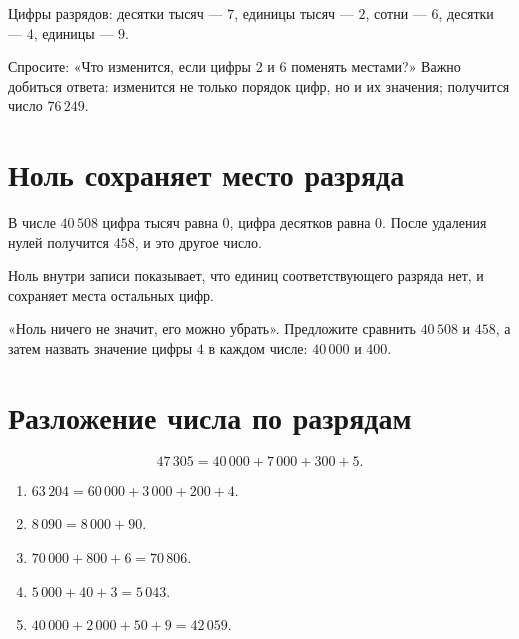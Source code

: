 Цифры разрядов: десятки тысяч --- \(7\), единицы тысяч --- \(2\),
сотни --- \(6\), десятки --- \(4\), единицы --- \(9\).

\begin{teacherbox}
  Спросите: «Что изменится, если цифры \(2\) и \(6\) поменять местами?»
  Важно добиться ответа: изменится не только порядок цифр, но и их значения;
  получится число \(76\,249\).
\end{teacherbox}

\section{Ноль сохраняет место разряда}

\zeroplacefigure

В числе \(40\,508\) цифра тысяч равна \(0\), цифра десятков равна \(0\).
После удаления нулей получится \(458\), и это другое число.

\begin{conclusionbox}
  Ноль внутри записи показывает, что единиц соответствующего разряда нет,
  и сохраняет места остальных цифр.
\end{conclusionbox}

\begin{teacherbox}
  «Ноль ничего не значит, его можно убрать». Предложите сравнить
  \(40\,508\) и \(458\), а затем назвать значение цифры \(4\) в каждом
  числе: \(40\,000\) и \(400\).
\end{teacherbox}

\section{Разложение числа по разрядам}

\expandedformfigure

\[
  47\,305=40\,000+7\,000+300+5.
\]

\begin{fillbox}[Ответы]
  \begin{enumerate}
    \item \(63\,204=60\,000+3\,000+200+4\).
    \item \(8\,090=8\,000+90\).
    \item \(70\,000+800+6=70\,806\).
    \item \(5\,000+40+3=5\,043\).
    \item \(40\,000+2\,000+50+9=42\,059\).
  \end{enumerate}
\end{fillbox}

